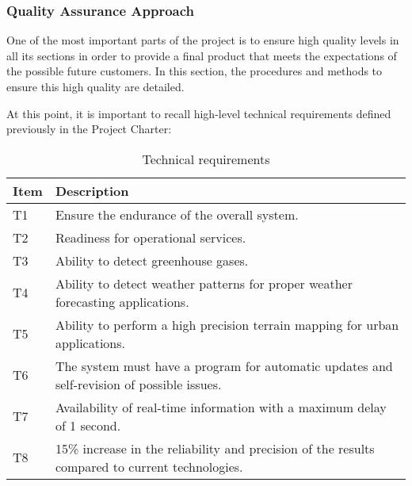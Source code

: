 \subsubsection{Quality Assurance Approach}
One of the most important parts of the project is to ensure high quality levels in all its sections in order to provide a final product that meets the expectations of the possible future customers. In this section, the procedures and methods to ensure this high quality are detailed. 

At this point, it is important to recall high-level technical requirements defined previously in the Project Charter:
\begin{table}[H]
	\centering
	\begin{tabular}{l p{13.3cm}}
		
		\toprule[2pt]
		
		\textbf{Item} &  \textbf{Description}\\
		
		\midrule [1.5pt]
		
		T1 & Ensure the endurance of the overall system.\vspace{0.2cm}\\
		
		\midrule
		
		T2 & Readiness for operational services.\vspace{0.2cm}\\
		
		\midrule
		
		T3 & Ability to detect greenhouse gases.\vspace{0.2cm}\\
		
		\midrule
		
		T4 & Ability to detect weather patterns for proper weather forecasting applications.\vspace{0.2cm}\\
		
		\midrule
		
		T5 & Ability to perform a high precision terrain mapping for urban applications.\vspace{0.2cm}\\
		
		\midrule
		
		T6 & The system must have a program for automatic updates and self-revision of possible issues.\vspace{0.2cm}\\
		
		\midrule
		
		T7 & Availability of real-time information with a maximum delay of 1 second.\vspace{0.2cm}\\
		
		\midrule
		
		T8 & 15\% increase in the reliability and precision of the results compared to current technologies.\vspace{0.2cm}\\
		
		\bottomrule[2pt]
		
	\end{tabular}
	\caption{Technical requirements}
\end{table}

